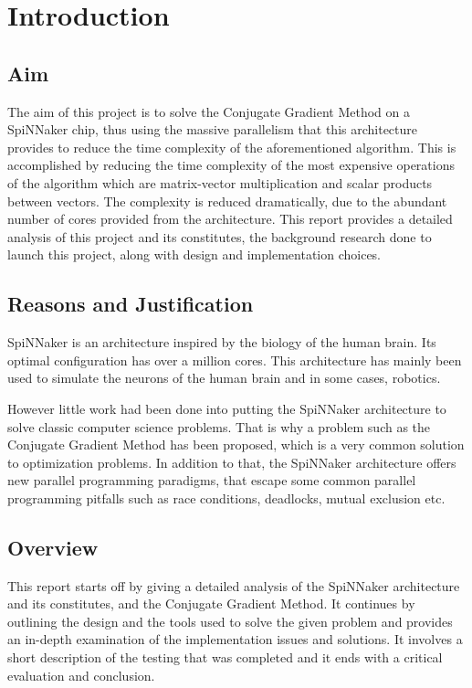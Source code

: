 \documentclass[12pt,twosided]{article}
\author{Alexandros-Panagiotis Oikonomou}
\begin{document}
\section{Introduction}
\subsection{Aim}
The aim of this project is to solve the Conjugate Gradient Method\cite{hestenes1952methods} on a SpiNNaker chip, thus using the massive parallelism that this architecture provides to reduce the time complexity of the aforementioned algorithm. This is accomplished by reducing the time complexity of the most expensive operations of the algorithm which are matrix-vector multiplication and scalar products between vectors. The complexity is reduced dramatically, due to the abundant number of cores provided from the architecture. This report provides a detailed analysis of this project and its constitutes, the background research done to launch this project, along with design and implementation choices.
\subsection{Reasons and Justification}
\indent
SpiNNaker is an architecture inspired by the biology of the human brain. Its optimal configuration has over a million cores\cite{navaridas2009understanding}. This architecture has mainly been used to simulate the neurons of the human brain and in some cases, robotics.

However little work had been done into putting the SpiNNaker architecture to solve classic computer science problems. That is why a problem such as the Conjugate Gradient Method has been proposed, which is a very common solution to optimization problems. In addition to that, the SpiNNaker architecture offers new parallel programming paradigms, that escape some common parallel programming pitfalls such as race conditions, deadlocks, mutual exclusion etc\cite{sharp2011event}.
\subsection{Overview}
This report starts off by giving a detailed analysis of the SpiNNaker architecture and its constitutes, and the Conjugate Gradient Method. It continues by outlining the design and the tools used to solve the given problem and provides an in-depth examination of the implementation issues and solutions. It involves a short description of the testing that was completed and it ends with a critical evaluation and conclusion.
\newpage
\end{document}
